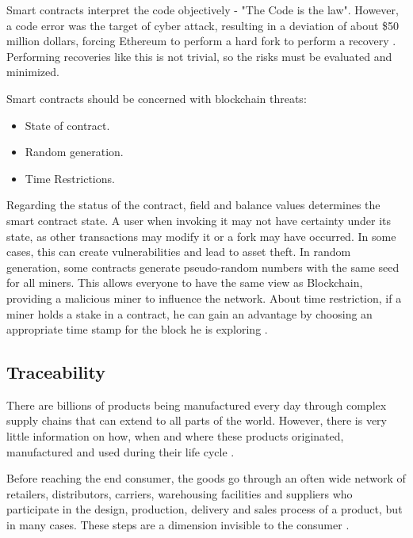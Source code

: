 \label{sec:seguranca}
Smart contracts interpret the code objectively - "The Code is the law". However, a code error was the target of cyber attack, resulting in a deviation of about \$50 million dollars, forcing Ethereum to perform a hard fork to perform a recovery \cite{bashir2018mastering}. Performing recoveries like this is not trivial, so the risks must be evaluated and minimized.

Smart contracts should be concerned with blockchain threats:
\begin{itemize}
\item State of contract.
\item Random generation.
\item Time Restrictions.
\end{itemize}

Regarding the status of the contract, field and balance values determines the smart contract state. A user when invoking it may not have certainty under its state, as other transactions may modify it or a fork may have occurred. In some cases, this can create vulnerabilities and lead to asset theft. In random generation, some contracts generate pseudo-random numbers with the same seed for all miners. This allows everyone to have the same view as Blockchain, providing
a malicious miner to influence the network. About time restriction, if a miner holds a stake in a contract, he can gain an advantage by choosing an appropriate time stamp for the block he is exploring \cite{greve2018blockchain}.


\subsection{Traceability}\label{sec:traceability}

There are billions of products being manufactured every day through complex supply chains that can extend to all parts of the world. However, there is very little information on how, when and where these products originated, manufactured and used during their life cycle \cite{horiuchirastreabilidade}.

Before reaching the end consumer, the goods go through an often wide network of retailers, distributors, carriers, warehousing facilities and suppliers who participate in the design, production, delivery and sales process of a product, but in many cases. These steps are a dimension invisible to the consumer \cite{provenance2015}.

